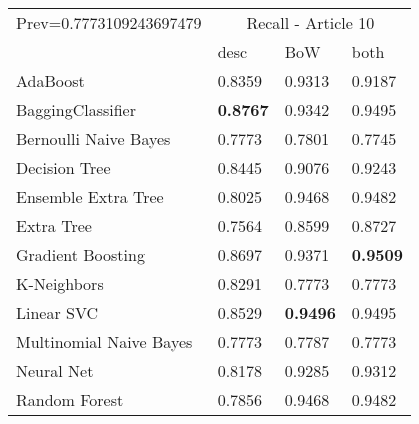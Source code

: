 \begin{tabular}{|l|l|l|l| }
\hline
Prev=0.7773109243697479 &  \multicolumn{3}{c|}{Recall - Article 10} \\
\cline{2-4} & desc & BoW & both \\ \hline
AdaBoost                & 0.8359 & 0.9313 & 0.9187\\
BaggingClassifier       & {\bf 0.8767} & 0.9342 & 0.9495\\
Bernoulli Naive Bayes   & 0.7773 & 0.7801 & 0.7745\\
Decision Tree           & 0.8445 & 0.9076 & 0.9243\\
Ensemble Extra Tree     & 0.8025 & 0.9468 & 0.9482\\
Extra Tree              & 0.7564 & 0.8599 & 0.8727\\
Gradient Boosting       & 0.8697 & 0.9371 & {\bf 0.9509}\\
K-Neighbors             & 0.8291 & 0.7773 & 0.7773\\
Linear SVC              & 0.8529 & {\bf 0.9496} & 0.9495\\
Multinomial Naive Bayes & 0.7773 & 0.7787 & 0.7773\\
Neural Net              & 0.8178 & 0.9285 & 0.9312\\
Random Forest           & 0.7856 & 0.9468 & 0.9482\\
\hline
\end{tabular}